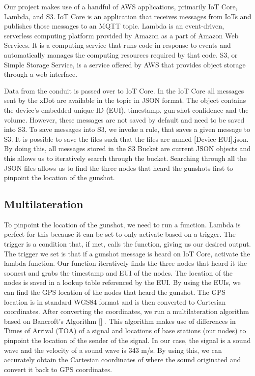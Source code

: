 \documentclass[conference]{IEEEtran}
\begin{document}
Our project makes use of a handful of AWS applications, primarily IoT Core, Lambda, and S3. IoT Core is an application that receives messages from IoTs and publishes those messages to an MQTT topic. Lambda is an event-driven, serverless computing platform provided by Amazon as a part of Amazon Web Services. It is a computing service that runs code in response to events and automatically manages the computing resources required by that code. S3, or Simple Storage Service, is a service offered by AWS that provides object storage through a web interface. 

Data from the conduit is passed over to IoT Core. In the IoT Core all messages sent by the xDot are available in the topic in JSON format. The object contains the device’s embedded unique ID (EUI), timestamp, gun-shot confidence and the volume. However, these messages are not saved by default and need to be saved into S3. To save messages into S3, we invoke a rule, that saves a given message to S3. It is possible to save the files such that the files are named [Device EUI].json. By doing this, all messages stored in the S3 Bucket are current JSON objects and this allows us to iteratively search through the bucket. Searching through all the JSON files allows us to find the three nodes that heard the gunshots first to pinpoint the location of the gunshot.

\subsection {Multilateration}
To pinpoint the location of the gunshot, we need to run a function. Lambda is perfect for this because it can be set to only activate based on a trigger. The trigger is a condition that, if met, calls the function, giving us our desired output. The trigger we set is that if a gunshot message is heard on IoT Core, activate the lambda function. Our function iteratively finds the three nodes that heard it the soonest and grabs the timestamp and EUI of the nodes. The location of the nodes is saved in a lookup table referenced by the EUI. By using the EUIs, we can find the GPS location of the nodes that heard the gunshot. The GPS location is in standard WGS84 format and is then converted to Cartesian coordinates. After converting the coordinates, we run a multilateration algorithm based on Bancroft’s Algorithm [] . This algorithm makes use of differences in Times of Arrival (TOA) of a signal and locations of base stations (our nodes) to pinpoint the location of the sender of the signal. In our case, the signal is a sound wave and the velocity of a sound wave is 343 m/s. By using this, we can accurately obtain the Cartesian coordinates of where the sound originated and convert it back to GPS coordinates.
\end{document}

